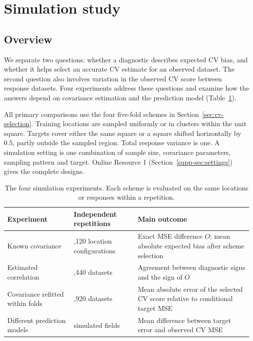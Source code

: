 \section{Simulation study}
\label{sec:simulation}
\suppressfloats[t]
\subsection{Overview}
We separate two questions: whether a diagnostic describes expected CV bias, and whether it helps select an accurate CV estimate for an observed dataset. The second question also involves variation in the observed CV score between response datasets. Four experiments address these questions and examine how the answers depend on covariance estimation and the prediction model (Table~\ref{tab:studies}).

All primary comparisons use the four five-fold schemes in Section~\ref{sec:cv-selection}. Training locations are sampled uniformly or in clusters within the unit square. Targets cover either the same square or a square shifted horizontally by $0.5$, partly outside the sampled region. Total response variance is one. A simulation setting is one combination of sample size, covariance parameters, sampling pattern and target. Online Resource 1 (Section~\ref*{supp-sec:settings}) gives the complete designs.

\begin{table}[!htbp]
\centering\small
\caption{The four simulation experiments. Each scheme is evaluated on the same locations or responses within a repetition.}
\label{tab:studies}
\begin{tabular}{>{\raggedright\arraybackslash}p{}>{\raggedright\arraybackslash}p{}>{\raggedright\arraybackslash}p{}}
\toprule
Experiment & Independent repetitions & Main outcome\\
\midrule
Known covariance & 5,120 location configurations & Exact MSE difference $O$; mean absolute expected bias after scheme selection\\
Estimated correlation & 1,440 datasets & Agreement between diagnostic signs and the sign of $O$\\
Covariance refitted within folds & 1,920 datasets & Mean absolute error of the selected CV score relative to conditional target MSE\\
Different prediction models & 480 simulated fields & Mean difference between target error and observed CV MSE\\
\bottomrule
\end{tabular}
\end{table}

